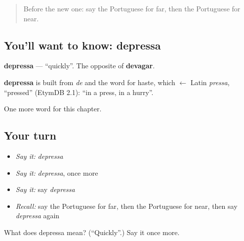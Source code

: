 \begin{quote}
Before the new one: say the Portuguese for far, then the Portuguese for near.
\end{quote}

\subsection*{You'll want to know: depressa}
\textbf{depressa} — \textquotedblleft{}quickly\textquotedblright{}. The opposite of \textbf{devagar}.

\begin{cousinweb}
\textbf{depressa} is built from \emph{de} and the word for haste, which $\leftarrow$ Latin \emph{pressa}, \textquotedblleft{}pressed\textquotedblright{} (EtymDB 2.1): \textquotedblleft{}in a press, in a hurry\textquotedblright{}.
\end{cousinweb}

\begin{grammarlens}[title={What you've built}]
One more word for this chapter.
\end{grammarlens}

\subsection*{Your turn}
\begin{itemize}
\raggedright
  \item \emph{Say it:} \emph{depressa}
  \item \emph{Say it:} \emph{depressa}, once more
  \item \emph{Say it:} say \emph{depressa}
  \item \emph{Recall:} say the Portuguese for far, then the Portuguese for near, then say \emph{depressa} again
\end{itemize}

\begin{tcolorbox}[breakable,colback=teal!4,colframe=teal!35!black,title={Before you move on}]
What does depressa mean? (\textquotedblleft{}Quickly\textquotedblright{}.) Say it once more.
\end{tcolorbox}
